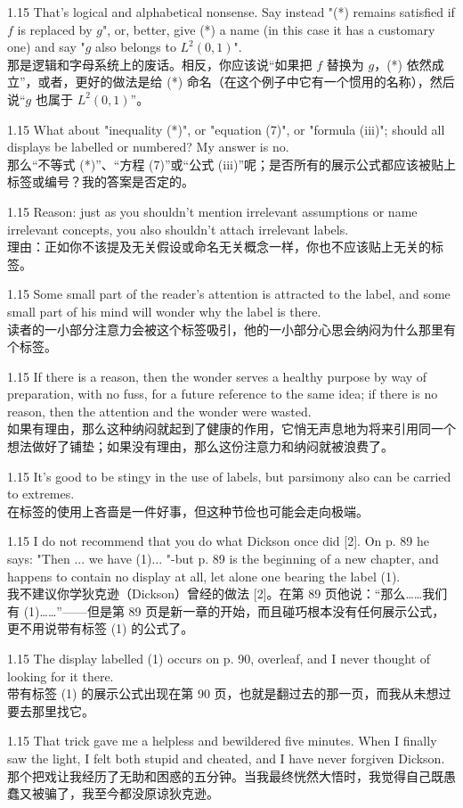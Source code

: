 \documentclass[12pt,a4paper]{article}
\newcommand{\bilingual}[2]{
    \begin{spacing}{1.15} %
        \noindent \normalsize #1 \\[-0.5ex] %
        \small \textcolor{blue!70!black}{#2} %
    \end{spacing}
    \vspace{0.8em} %
}
\begin{document}
\bilingual{That's logical and alphabetical nonsense. Say instead "(*) remains satisfied if $f$ is replaced by $g$", or, better, give (*) a name (in this case it has a customary one) and say "$g$ also belongs to $L^{2}(0,1)$".}
{那是逻辑和字母系统上的废话。相反，你应该说“如果把 $f$ 替换为 $g$，(*) 依然成立”，或者，更好的做法是给 (*) 命名（在这个例子中它有一个惯用的名称），然后说“$g$ 也属于 $L^{2}(0,1)$”。} %

\bilingual{What about "inequality (*)", or "equation (7)", or "formula (iii)"; should all displays be labelled or numbered? My answer is no.}
{那么“不等式 (*)”、“方程 (7)”或“公式 (iii)”呢；是否所有的展示公式都应该被贴上标签或编号？我的答案是否定的。} %

\bilingual{Reason: just as you shouldn't mention irrelevant assumptions or name irrelevant concepts, you also shouldn't attach irrelevant labels.}
{理由：正如你不该提及无关假设或命名无关概念一样，你也不应该贴上无关的标签。} %

\bilingual{Some small part of the reader's attention is attracted to the label, and some small part of his mind will wonder why the label is there.}
{读者的一小部分注意力会被这个标签吸引，他的一小部分心思会纳闷为什么那里有个标签。} %

\bilingual{If there is a reason, then the wonder serves a healthy purpose by way of preparation, with no fuss, for a future reference to the same idea; if there is no reason, then the attention and the wonder were wasted.}
{如果有理由，那么这种纳闷就起到了健康的作用，它悄无声息地为将来引用同一个想法做好了铺垫；如果没有理由，那么这份注意力和纳闷就被浪费了。} %

\bilingual{It's good to be stingy in the use of labels, but parsimony also can be carried to extremes.}
{在标签的使用上吝啬是一件好事，但这种节俭也可能会走向极端。} %

\bilingual{I do not recommend that you do what Dickson once did [2]. On p. 89 he says: "Then ... we have (1)... "-but p. 89 is the beginning of a new chapter, and happens to contain no display at all, let alone one bearing the label (1).}
{我不建议你学狄克逊（Dickson）曾经的做法 [2]。在第 89 页他说：“那么……我们有 (1)……”——但是第 89 页是新一章的开始，而且碰巧根本没有任何展示公式，更不用说带有标签 (1) 的公式了。} %

\bilingual{The display labelled (1) occurs on p. 90, overleaf, and I never thought of looking for it there.}
{带有标签 (1) 的展示公式出现在第 90 页，也就是翻过去的那一页，而我从未想过要去那里找它。} %

\bilingual{That trick gave me a helpless and bewildered five minutes. When I finally saw the light, I felt both stupid and cheated, and I have never forgiven Dickson.}
{那个把戏让我经历了无助和困惑的五分钟。当我最终恍然大悟时，我觉得自己既愚蠢又被骗了，我至今都没原谅狄克逊。} %
\end{document}
